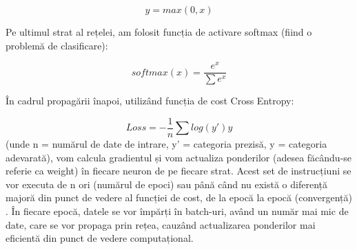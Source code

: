 \documentclass[a4paper,12pt]{report}
\begin{document}
   \begin{equation}
   \label{relu_formula}
  		y = max(0,x)
   \end{equation}
   
   Pe ultimul strat al rețelei, am folosit funcția de activare softmax (fiind o problemă de clasificare):
   
   \begin{equation}
   \label{softmax_formula}
   		softmax(x) =\frac{ e^x}{\sum e^x}
   \end{equation}
   
   În cadrul propagării înapoi, utilizând funcția de cost Cross Entropy:
   
   \begin{equation}
   \label{cross_entropy_formula}
	   Loss= -\frac{1}{n}\sum log(y')y
   \end{equation}
   (unde n = numărul de date de intrare, y' = categoria prezisă, y = categoria adevarată), vom calcula gradientul și vom actualiza ponderilor (adesea făcându-se referie ca weight) în fiecare neuron de pe fiecare strat. Acest set de instrucțiuni se vor executa de n ori (numărul de epoci) sau până când nu există o diferență majoră din punct de vedere al funcției de cost, de la epocă la epocă (convergență) . În fiecare epocă, datele se vor împărți în batch-uri, având un număr mai mic de date, care se vor propaga prin rețea, cauzând actualizarea ponderilor mai eficientă din punct de vedere computațional.
   
\end{document}
